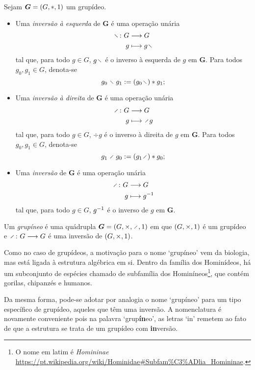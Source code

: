 \begin{definition}[Inversão]
Sejam $\bm G = (G,\ast,1)$ um grupídeo.
	\begin{itemize}
	\item Uma \emph{inversão à esquerda} de $\bm G$ é uma operação unária
		\begin{align*}
		\func{\vid}{G}{G}{g}{g \vid}
		\end{align*}
	tal que, para todo $g \in G$, $g \vid$ é o inverso à esquerda de $g$ em $\bm G$. Para todos $g_0,g_1 \in G$, denota-se
		\begin{equation*}
		g_0 \vid g_1 := (g_0 \vid) \opb g_1;
		\end{equation*}

	\item Uma \emph{inversão à direita} de $\bm G$ é uma operação unária
		\begin{align*}
		\func{\div}{G}{G}{g}{\div g}
		\end{align*}
	tal que, para todo $g \in G$, $\div g$ é o inverso à direita de $g$ em $\bm G$. Para todos $g_0,g_1 \in G$, denota-se
		\begin{equation*}
		g_1 \div g_0 := (g_1 \div) \opb g_0;
		\end{equation*}

	\item Uma \emph{inversão} de $\bm G$ é uma operação unária
		\begin{align*}
		\func{\div}{G}{G}{g}{g\inv}
		\end{align*}
	tal que, para todo $g \in G$, $g^{-1}$ é o inverso de $g$ em $\bm G$.
	\end{itemize}
\end{definition}

\begin{definition}
Um \emph{grupíneo} é uma quádrupla $\bm G = (G,\times,\div,\id)$ em que $(G,\times,1)$ é um grupídeo e $\fun{\div}{G}{G}$ é uma inversão de $(G,\times,1)$.
\end{definition}

Como no caso de grupídeos, a motivação para o nome `grupíneo' vem da biologia, mas está ligada à estrutura algébrica em si. Dentro da família dos Hominídeos, há um subconjunto de espécies chamado de subfamília dos Hominíneos\footnote{O nome em latim é \textit{Homininae} \url{https://pt.wikipedia.org/wiki/Hominidae\#Subfam\%C3\%ADlia_Homininae}.}, que contém gorilas, chipanzés e humanos.

Da mesma forma, pode-se adotar por analogia o nome `grupíneo' para um tipo específico de grupídeo, aqueles que têm uma inversão. A nomenclatura é novamente conveniente pois na palavra `grup\textbf{ín}eo', as letras `in' remetem ao fato de que a estrutura se trata de um grupídeo com \textbf{in}versão.

